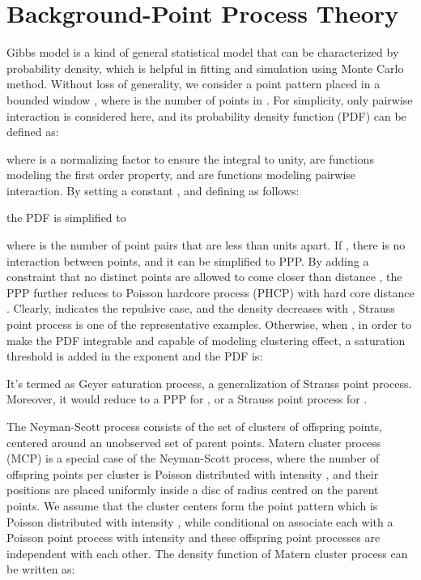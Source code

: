 \documentclass[conference]{IEEEtran}
\begin{document}
\section{Background-Point Process Theory}
Gibbs model\cite{chiu2013stochastic} is a kind of general statistical model that can be characterized by probability density, which is helpful in fitting and simulation using Monte Carlo method. Without loss of generality, we consider a point pattern  placed in a bounded window , where  is the number of points in . For simplicity, only pairwise interaction is considered here, and its probability density function (PDF) can be defined as:

where  is a normalizing factor to ensure the integral to unity,  are functions modeling the first order property, and  are functions modeling pairwise interaction. By setting  a constant , and defining  as follows:

the PDF is simplified to

where  is the number of point pairs that are less than  units apart. If , there is no interaction between points, and it can be simplified to PPP. By adding a constraint that no distinct points are allowed to come closer than distance , the PPP further reduces to Poisson hardcore process (PHCP) with hard core distance . Clearly,  indicates the repulsive case, and the density decreases with , Strauss point process is one of the representative examples. Otherwise, when , in order to make the PDF integrable and capable of modeling clustering effect, a saturation threshold is added in the exponent and the PDF is:

It's termed as Geyer saturation process, a generalization of Strauss point process. Moreover, it would reduce to a PPP for , or a Strauss point process for .

The Neyman-Scott process\cite{chiu2013stochastic} consists of the set of clusters of offspring points, centered around an unobserved set of parent points. Matern cluster process (MCP) is a special case of the Neyman-Scott process, where the number of offspring points per cluster is Poisson distributed with intensity , and their positions are placed uniformly inside a disc of radius  centred on the parent points. We assume that the cluster centers form the point pattern  which is Poisson distributed with intensity , while conditional on  associate each  with a Poisson point process  with intensity  and these offspring point processes are independent with each other. The density function of Matern cluster process can be written as:
\end{document}
